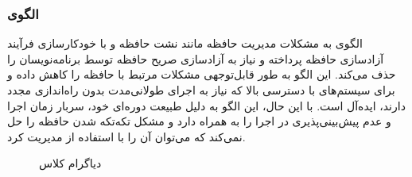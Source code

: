 \subsubsection{الگوی }
\label{memGarbCollectionSec}
\begin{RTL}
الگوی  \cite{ref4} به مشکلات
مدیریت حافظه مانند نشت حافظه و  با
خودکارسازی فرآیند آزادسازی حافظه پرداخته و نیاز به آزادسازی صریح
حافظه توسط برنامه‌نویسان را حذف می‌کند. این الگو به طور
قابل‌توجهی مشکلات مرتبط با حافظه را کاهش داده و برای سیستم‌های
با دسترسی بالا که نیاز به اجرای طولانی‌مدت بدون راه‌اندازی مجدد دارند،
ایده‌آل است. با این حال، این الگو به دلیل طبیعت دوره‌ای خود، سربار
زمان اجرا و عدم پیش‌بینی‌پذیری در اجرا را به همراه دارد و
مشکل تکه‌تکه شدن حافظه را حل نمی‌کند که می‌توان
آن را با استفاده از  مدیریت کرد.
\end{RTL}
\begin{figure}[h!]
\centering
{}
\caption{دیاگرام کلاس }
\label{memGarbCollectionClassDiag}
\end{figure}